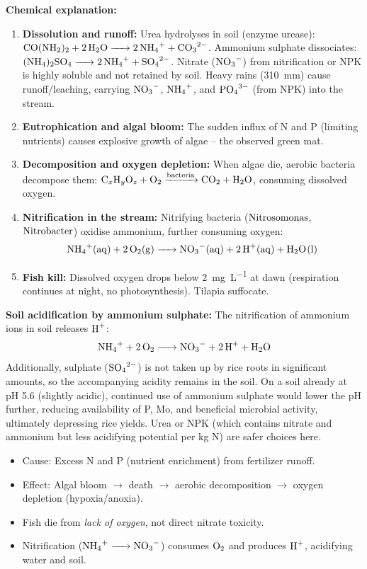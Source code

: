\documentclass[11pt]{article}
\begin{document}
\textbf{Chemical explanation:}
\begin{enumerate}
\item \textbf{Dissolution and runoff:} Urea hydrolyses in soil (enzyme urease): $\ce{CO(NH2)2 + 2H2O -> 2NH4+ + CO3^{2-}}$. Ammonium sulphate dissociates: $\ce{(NH4)2SO4 -> 2NH4+ + SO4^{2-}}$. Nitrate ($\ce{NO3-}$) from nitrification or NPK is highly soluble and not retained by soil. Heavy rains (\SI{310}{mm}) cause runoff/leaching, carrying $\ce{NO3-}$, $\ce{NH4+}$, and $\ce{PO4^{3-}}$ (from NPK) into the stream.
\item \textbf{Eutrophication and algal bloom:} The sudden influx of N and P (limiting nutrients) causes explosive growth of algae -- the observed green mat.
\item \textbf{Decomposition and oxygen depletion:} When algae die, aerobic bacteria decompose them: $\ce{C_xH_yO_z + O2 ->[bacteria] CO2 + H2O}$, consuming dissolved oxygen.
\item \textbf{Nitrification in the stream:} Nitrifying bacteria ($\ce{Nitrosomonas}$, $\ce{Nitrobacter}$) oxidise ammonium, further consuming oxygen:
\[ \ce{NH4+(aq) + 2O2(g) -> NO3-(aq) + 2H+(aq) + H2O(l)} \]
\item \textbf{Fish kill:} Dissolved oxygen drops below \SI{2}{mg.L^{-1}} at dawn (respiration continues at night, no photosynthesis). Tilapia suffocate.
\end{enumerate}

\textbf{Soil acidification by ammonium sulphate:}
The nitrification of ammonium ions in soil releases $\ce{H+}$:
\[ \ce{NH4+ + 2O2 -> NO3- + 2H+ + H2O} \]
Additionally, sulphate ($\ce{SO4^{2-}}$) is not taken up by rice roots in significant amounts, so the accompanying acidity remains in the soil. On a soil already at pH 5.6 (slightly acidic), continued use of ammonium sulphate would lower the pH further, reducing availability of P, Mo, and beneficial microbial activity, ultimately depressing rice yields. Urea or NPK (which contains nitrate and ammonium but less acidifying potential per kg N) are safer choices here.

\begin{aretenir}
\begin{itemize}
\item Cause: Excess N and P (nutrient enrichment) from fertilizer runoff.
\item Effect: Algal bloom $\to$ death $\to$ aerobic decomposition $\to$ oxygen depletion (hypoxia/anoxia).
\item Fish die from \emph{lack of oxygen}, not direct nitrate toxicity.
\item Nitrification ($\ce{NH4+ -> NO3-}$) consumes $\ce{O2}$ and produces $\ce{H+}$, acidifying water and soil.
\end{itemize}
\end{aretenir}
\end{document}
